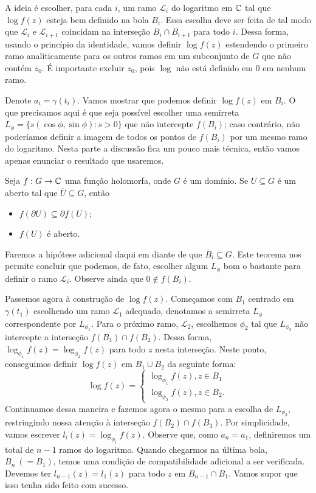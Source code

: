 A ideia é escolher, para cada $i$, um ramo $\mathcal{L}_i$ do logaritmo em $\mathbb{C}$ tal que 
$\log f(z)$ esteja bem definido na bola $B_i$. Essa escolha deve ser feita de tal modo que
$\mathcal{L}_i$ e $\mathcal{L}_{i+1}$ coincidam na interseção $B_i \cap B_{i+1}$ para todo $i$.
Dessa forma, usando o princípio da identidade, vamos definir $\log f(z)$ estendendo o primeiro
ramo analiticamente para os outros ramos em um subconjunto de $G$ que não contém $z_0$. 
É importante excluir $z_0$, pois $\log$ não está definido em $0$ em nenhum ramo.

Denote $a_i = \gamma(t_i)$. Vamos mostrar que podemos definir $\log f(z)$ em $B_i$. 
O que precisamos aqui é que seja possível escolher uma semirreta 
$L_\phi = \{s(\cos \phi, \sin \phi): s > 0\}$ que não intercepte $f(B_i)$; caso contrário, 
não poderíamos definir a imagem de todos os pontos de $f(B_i)$ por um mesmo ramo do logaritmo.
Nesta parte a discussão fica um pouco mais técnica, então vamos apenas enunciar o resultado 
que usaremos. 
%
\begin{teorema}
    Seja $f: G \to \mathbb{C}$ uma função holomorfa, onde $G$ é um domínio. 
    Se $U \subseteq G$ é um aberto tal que $\overline{U} \subseteq G$, então
    \begin{itemize}
        \item $f(\partial U) \subseteq \partial f(U)$;
        \item $f(U)$ é aberto.
    \end{itemize}
\end{teorema}
%
Faremos a hipótese adicional daqui em diante de que $\overline{B}_i \subseteq G$. 
Este teorema nos permite concluir que podemos, de fato, escolher algum $L_\phi$ 
bom o bastante para definir o ramo $\mathcal{L}_i$. Observe ainda que $0 \not \in f(B_i)$.

Passemos agora à construção de $\log f(z)$. Começamos com $B_1$ centrado em $\gamma(t_1)$
escolhendo um ramo $\mathcal{L}_1$ adequado, denotamos a semirreta $L_\phi$ correspondente por
$L_{\phi_1}$. Para o próximo ramo, $\mathcal{L}_2$, escolhemos $\phi_2$ tal que $L_{\phi_2}$
não intercepte a interseção $f(B_1) \cap f(B_2)$. Dessa forma, 
$\log_{\phi_1} f(z) = \log_{\phi_2} f(z)$ para todo $z$ nesta interseção. 
Neste ponto, conseguimos definir $\log f(z)$ em $B_1 \cup B_2$ da seguinte forma:
%
\begin{equation*}
    \log f(z) =
    \begin{cases}
        \log_{\phi_1} f(z), z \in B_1 \\
        \log_{\phi_2} f(z), z \in B_2.
    \end{cases}
\end{equation*}
%
Continuamos dessa maneira e fazemos agora o mesmo para a escolha de $L_{\phi_3}$, 
restringindo nossa atenção à interseção $f(B_2) \cap f(B_3)$. Por simplicidade, 
vamos escrever $l_i(z) =  \log_{\phi_i} f(z)$. Observe que, como $a_n = a_1$, 
definiremos um total de $n-1$ ramos do logaritmo. Quando chegarmos na última bola, 
$B_n \ (= B_1)$, temos uma condição de compatibilidade adicional a ser verificada. 
Devemos ter $l_{n-1}(z) = l_1(z)$ para todo $z$ em $B_{n-1} \cap B_1$. Vamos supor que isso
tenha sido feito com sucesso.

